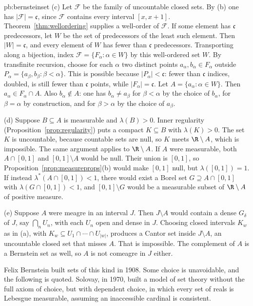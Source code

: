 \begin{solution}{pb:bernsteinset}
(c) Let $\mathcal F$ be the family of uncountable closed sets. By (b) one has $|\mathcal F|=\mathfrak c$, since $\mathcal F$ contains every interval $[x,x+1]$. Theorem~\ref{thm:wellordering} supplies a well-order of $\mathcal F$. If some element has $\mathfrak c$ predecessors, let $W$ be the set of predecessors of the least such element. Then $|W|=\mathfrak c$, and every element of $W$ has fewer than $\mathfrak c$ predecessors. Transporting along a bijection, index $\mathcal F=\{F_\alpha:\alpha\in W\}$ by this well-ordered set $W$. By transfinite recursion, choose for each $\alpha$ two distinct points $a_\alpha,b_\alpha\in F_\alpha$ outside $P_\alpha=\{a_\beta,b_\beta:\beta<\alpha\}$. This is possible because $|P_\alpha|<\mathfrak c$: fewer than $\mathfrak c$ indices, doubled, is still fewer than $\mathfrak c$ points, while $|F_\alpha|=\mathfrak c$. Let $A=\{a_\alpha:\alpha\in W\}$. Then $a_\alpha\in F_\alpha\cap A$. Also $b_\alpha\notin A$: one has $b_\alpha\ne a_\beta$ for $\beta<\alpha$ by the choice of $b_\alpha$, for $\beta=\alpha$ by construction, and for $\beta>\alpha$ by the choice of $a_\beta$.

(d) Suppose $B\subseteq A$ is measurable and $\lambda(B)>0$. Inner regularity (Proposition~\ref{prop:regularity}) puts a compact $K\subseteq B$ with $\lambda(K)>0$. The set $K$ is uncountable, because countable sets are null, so $K$ meets $\R\setminus A$, which is impossible. The same argument applies to $\R\setminus A$. If $A$ were measurable, both $A\cap[0,1]$ and $[0,1]\setminus A$ would be null. Their union is $[0,1]$, so Proposition~\ref{prop:measureprops}(b) would make $[0,1]$ null, but $\lambda([0,1])=1$. If instead $\lambda^*(A\cap[0,1])<1$, there would exist a Borel set $G\supseteq A\cap[0,1]$ with $\lambda(G\cap[0,1])<1$, and $[0,1]\setminus G$ would be a measurable subset of $\R\setminus A$ of positive measure.

(e) Suppose $A$ were meagre in an interval $J$. Then $J\setminus A$ would contain a dense $G_\delta$ of $J$, say $\bigcap_n U_n$, with each $U_n$ open and dense in $J$. Choosing closed intervals $K_w$ as in (a), with $K_w\subseteq U_1\cap\cdots\cap U_{|w|}$, produces a Cantor set inside $J\setminus A$, an uncountable closed set that misses $A$. That is impossible. The complement of $A$ is a Bernstein set as well, so $A$ is not comeagre in $J$ either.

\leads Felix Bernstein built sets of this kind in 1908. Some choice is unavoidable, and the following is quoted. Solovay, in 1970, built a model of set theory without the full axiom of choice, but with dependent choice, in which every set of reals is Lebesgue measurable, assuming an inaccessible cardinal is consistent.
\end{solution}

